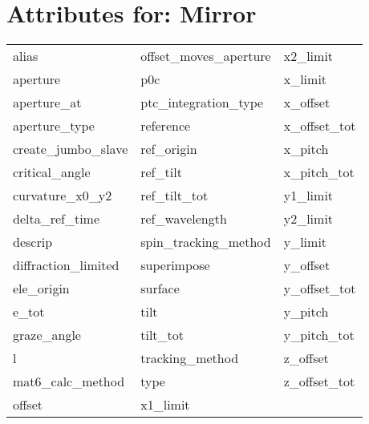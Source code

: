  \section{Attributes for: Mirror}
 \label{s:list.mirror}
 
 \begin{tabular}{lll} \toprule
alias                       & offset_moves_aperture       & x2_limit                    \\
aperture                    & p0c                         & x_limit                     \\
aperture_at                 & ptc_integration_type        & x_offset                    \\
aperture_type               & reference                   & x_offset_tot                \\
create_jumbo_slave          & ref_origin                  & x_pitch                     \\
critical_angle              & ref_tilt                    & x_pitch_tot                 \\
curvature_x0_y2             & ref_tilt_tot                & y1_limit                    \\
delta_ref_time              & ref_wavelength              & y2_limit                    \\
descrip                     & spin_tracking_method        & y_limit                     \\
diffraction_limited         & superimpose                 & y_offset                    \\
ele_origin                  & surface                     & y_offset_tot                \\
e_tot                       & tilt                        & y_pitch                     \\
graze_angle                 & tilt_tot                    & y_pitch_tot                 \\
l                           & tracking_method             & z_offset                    \\
mat6_calc_method            & type                        & z_offset_tot                \\
offset                      & x1_limit                    &                             \\
 \bottomrule
 \end{tabular}
 \vfill
 
